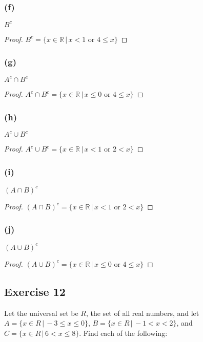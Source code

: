 \documentclass[14pt]{extarticle}
\newcommand{\R}{\mathbb{R}}
\begin{document}
\subsubsection{(f)}
$B^c$

\begin{proof}
  \(B^c = \{x \in \R \, | \, x < 1 \text{ or } 4 \leq x\}\)
\end{proof}

\subsubsection{(g)}
$A^c \cap B^c$

\begin{proof}
  \(A^c \cap B^c = \{x \in \R \, | \, x \leq 0 \text{ or } 4 \leq x\}\)
\end{proof}

\subsubsection{(h)}
$A^c \cup B^c$

\begin{proof}
  \(A^c \cup B^c = \{x \in \R \, | \, x < 1 \text{ or } 2 < x\}\)
\end{proof}

\subsubsection{(i)}
$(A \cap B)^c$

\begin{proof}
  \((A \cap B)^c = \{x \in \R \, | \, x < 1 \text{ or } 2 < x\}\)
\end{proof}

\subsubsection{(j)}
$(A \cup B)^c$

\begin{proof}
  \((A \cup B)^c = \{x \in \R \, | \, x \leq 0 \text{ or } 4 \leq x\}\)
\end{proof}

\subsection{Exercise 12}
Let the universal set be $R$, the set of all real numbers, and let \(A = \{x \in R \,|\, -3 \leq x \leq 0\}\), \(B =
\{x \in R \, | \, -1 < x < 2\}\), and \(C = \{x \in R \, | \, 6 < x \leq 8\}\). Find each of the following:
\end{document}
